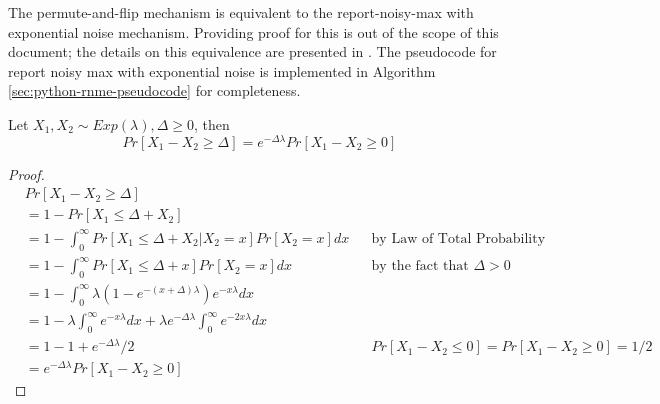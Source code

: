 \documentclass{article} %
\begin{document}
\begin{lemma}
    \label{lemma:equivalence_pf_rnme}
 The permute-and-flip mechanism is equivalent to the report-noisy-max with exponential noise mechanism. Providing proof for this is out of the scope of this document; the details on this equivalence are presented in \cite{ding2021permute}. The pseudocode for report noisy max with exponential noise is implemented in Algorithm \ref{sec:python-rnme-pseudocode} for completeness.
\end{lemma}


\begin{lemma}
    \label{lemma:diff_cdf}
 Let $X_1, X_2 \sim Exp(\lambda), \Delta \geq 0$, then 
    \begin{equation}
 Pr[X_1 - X_2 \geq \Delta] = e^{-\Delta\lambda} Pr[X_1 - X_2 \geq 0]  
    \end{equation}

    \begin{proof}
        \begin{align}
        & Pr[X_1 - X_2 \geq \Delta] \\
        & = 1 - Pr[X_1 \leq \Delta + X_2] \\
        & = 1 - \int^\infty_0 Pr[X_1 \leq \Delta + X_2 | X_2 = x] Pr[X_2 = x] dx && \text{by Law of Total Probability} \\
        & = 1 - \int^\infty_0 Pr[X_1 \leq \Delta + x]Pr[X_2 = x] dx  && \text{by the fact that } \Delta >0 \\
        & = 1 - \int^\infty_0 \lambda(1 - e^{-(x + \Delta)\lambda})e^{-x\lambda}dx  \\
        & = 1 - \lambda \int^\infty_0 e^{-x\lambda} dx + \lambda e^{-\Delta\lambda} \int_0^\infty e^{-2x\lambda}dx \\
        & = 1 - 1 + e^{-\Delta\lambda} / 2 && \text{$Pr[X_1 - X_2 \leq 0] = Pr[X_1 - X_2 \geq 0] = 1/2$} \\
        & = e ^{-\Delta\lambda} Pr[X_1 - X_2 \geq 0] 
    \end{align}
    \end{proof}
\end{lemma}

\newcommand\logeq{\mathrel{\vcentcolon\Leftrightarrow}}
\end{document}
